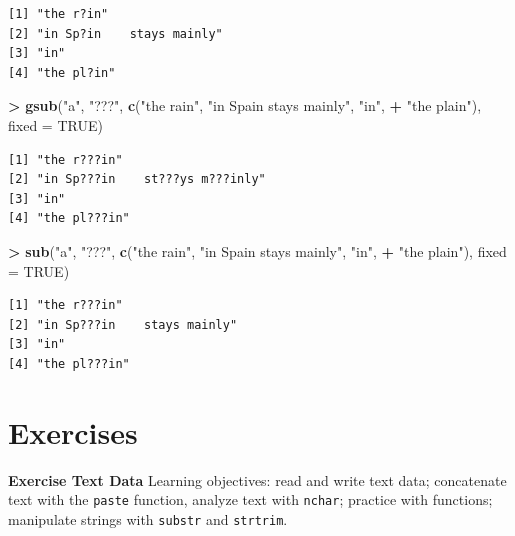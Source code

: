 \documentclass[]{krantz}
\makeatletter
\newenvironment{Shaded}{\begin{snugshade}}{\end{snugshade}}
\newcommand{\KeywordTok}[1]{\textcolor[rgb]{0.27,0.27,0.27}{\textbf{#1}}}
\newcommand{\DataTypeTok}[1]{\textcolor[rgb]{0.27,0.27,0.27}{#1}}
\newcommand{\StringTok}[1]{\textcolor[rgb]{0.5,0.5,0.5}{#1}}
\newcommand{\OtherTok}[1]{\textcolor[rgb]{0.37,0.37,0.37}{#1}}
\newcommand{\OperatorTok}[1]{\textcolor[rgb]{0.43,0.43,0.43}{\textbf{#1}}}
\newcommand{\NormalTok}[1]{#1}
\newenvironment{kframe}{%
\medskip{}
\setlength{\fboxsep}{.8em}
 \def\at@end@of@kframe{}%
 \ifinner\ifhmode%
  \def\at@end@of@kframe{\end{minipage}}%
  \begin{minipage}{\columnwidth}%
 \fi\fi%
 \def\FrameCommand##1{\hskip\@totalleftmargin \hskip-\fboxsep
 \colorbox{shadecolor}{##1}\hskip-\fboxsep
     \hskip-\linewidth \hskip-\@totalleftmargin \hskip\columnwidth}%
 \MakeFramed {\advance\hsize-\width
   \@totalleftmargin\z@ \linewidth\hsize
   \@setminipage}}%
 {\par\unskip\endMakeFramed%
 \at@end@of@kframe}
\renewenvironment{Shaded}{\begin{kframe}}{\end{kframe}}
\makeatother
\begin{document}
\begin{verbatim}
[1] "the r?in"                
[2] "in Sp?in    stays mainly"
[3] "in"                      
[4] "the pl?in"               
\end{verbatim}

\begin{Shaded}
\begin{Highlighting}[]
\OperatorTok{>}\StringTok{ }\KeywordTok{gsub}\NormalTok{(}\StringTok{"a"}\NormalTok{, }\StringTok{"???"}\NormalTok{, }\KeywordTok{c}\NormalTok{(}\StringTok{"the rain"}\NormalTok{, }\StringTok{"in Spain    stays mainly"}\NormalTok{, }\StringTok{"in"}\NormalTok{, }
\OperatorTok{+}\StringTok{                    "the plain"}\NormalTok{), }\DataTypeTok{fixed =} \OtherTok{TRUE}\NormalTok{)}
\end{Highlighting}
\end{Shaded}

\begin{verbatim}
[1] "the r???in"                    
[2] "in Sp???in    st???ys m???inly"
[3] "in"                            
[4] "the pl???in"                   
\end{verbatim}

\begin{Shaded}
\begin{Highlighting}[]
\OperatorTok{>}\StringTok{ }\KeywordTok{sub}\NormalTok{(}\StringTok{"a"}\NormalTok{, }\StringTok{"???"}\NormalTok{, }\KeywordTok{c}\NormalTok{(}\StringTok{"the rain"}\NormalTok{, }\StringTok{"in Spain    stays mainly"}\NormalTok{, }\StringTok{"in"}\NormalTok{, }
\OperatorTok{+}\StringTok{                   "the plain"}\NormalTok{), }\DataTypeTok{fixed =} \OtherTok{TRUE}\NormalTok{)}
\end{Highlighting}
\end{Shaded}

\begin{verbatim}
[1] "the r???in"                
[2] "in Sp???in    stays mainly"
[3] "in"                        
[4] "the pl???in"               
\end{verbatim}

\section{Exercises}\label{exercises-8}

\textbf{Exercise Text Data} Learning objectives: read and write text
data; concatenate text with the \texttt{paste} function, analyze text
with \texttt{nchar}; practice with functions; manipulate strings with
\texttt{substr} and \texttt{strtrim}.
\end{document}
